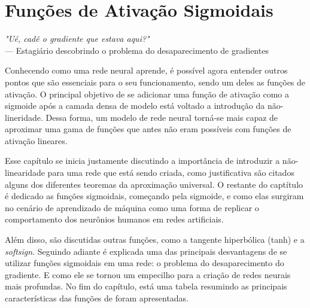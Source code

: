 
\chapter{Funções de Ativação Sigmoidais}
\label{cap:ativacao-sigmoidais}



\begin{flushright}
\textit{"Ué, cadê o gradiente que estava aqui?"} \\
--- Estagiário descobrindo o problema do desaparecimento de gradientes
\end{flushright}

Conhecendo como uma rede neural aprende, é possível agora entender outros pontos que são essenciais para o seu funcionamento, sendo um deles as funções de ativação. O principal objetivo de se adicionar uma função de ativação como a sigmoide após a camada densa de modelo está voltado a introdução da não-lineridade. Dessa forma, um modelo de rede neural torná-se mais capaz de aproximar uma gama de funções que antes não eram possíveis com funções de ativação lineares.

Esse capítulo se inicia justamente discutindo a importância de introduzir a não-linearidade para uma rede que está sendo criada, como justificativa são citados alguns dos diferentes teoremas da aproximação universal. O restante do captítulo é dedicado as funções sigmoidais, começando pela sigmoide, e como elas surgiram no cenário de aprendizado de máquina como uma forma de replicar o comportamento dos neurônios humanos em redes artificiais. 

Além disso, são discutidas outras funções, como a tangente hiperbólica (tanh) e a \textit{softsign}. Seguindo adiante é explicada uma das principais desvantagens de se utilizar funções sigmoidais em uma rede: o problema do desaparecimento do gradiente. E como ele se tornou um empecilho para a criação de redes neurais mais profundas. No fim do capítulo, está uma tabela resumindo as principais características das funções de foram apresentadas.

